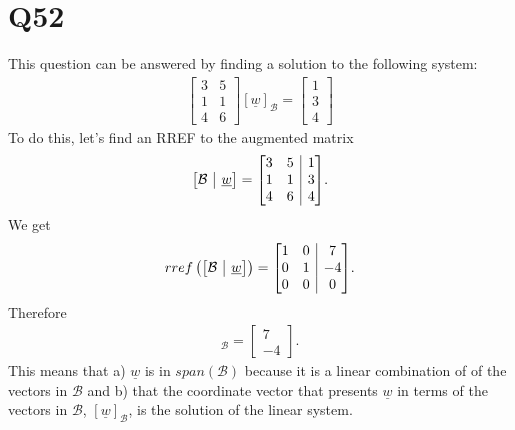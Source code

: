 \documentclass{article}
\makeatletter
\renewcommand{\vec}{\underline}
\newenvironment{amatrix}[1]{%
  \left[\begin{array}{@{}*{#1}{c}|c@{}}
}{%
  \end{array}\right]
}
\makeatother
\begin{document}
\section*{Q52}
This question can be answered by finding a solution to the following system:
\begin{align*}
    \begin{bmatrix}
        3 &5\\ 1 & 1\\ 4 &6
    \end{bmatrix}
    [\vec w]_{\mathcal{B}} =
    \begin{bmatrix}
        1 \\ 3 \\4
    \end{bmatrix}
\end{align*}
To do this, let's find an RREF to the augmented matrix
\begin{align*}
    \begin{amatrix}{1}
        \mathcal{B} &\vec w
    \end{amatrix} = 
    \begin{amatrix}{2}
        3 &5 &1 \\
        1 &1 & 3\\
        4 &6 & 4
    \end{amatrix}.
\end{align*}
We get
\begin{align*}
    rref\left(
    \begin{amatrix}{1}
        \mathcal{B} &\vec w
    \end{amatrix}\right)= 
    \begin{amatrix}{2}
        1 &0 &7\\
        0 &1 &-4\\
        0 &0 &0
    \end{amatrix}.
\end{align*}
Therefore
\begin{align*}
    [\vec w]_\mathcal{B} = \begin{bmatrix}
        7\\ -4
    \end{bmatrix}.
\end{align*}
This means that a) $\vec w$ is in $span(\mathcal{B})$ because it is a linear combination of of the vectors in $\mathcal{B}$ and b) that the coordinate vector that presents $\vec w$ in terms of the vectors in $\mathcal{B}$, $[\vec w]_\mathcal{B}$, is the solution of the linear system.
\end{document}
